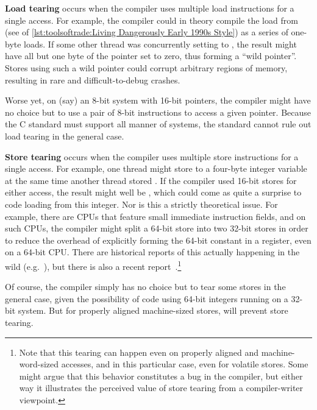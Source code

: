 {\bf Load tearing} occurs when the compiler uses multiple load
instructions for a single access.
For example, the compiler could in theory compile the load from
 (see
 of
\cref{lst:toolsoftrade:Living Dangerously Early 1990s Style})
as a series of one-byte loads.
If some other thread was concurrently setting  to
, the result might have all but one byte of the pointer
set to zero, thus forming a ``wild pointer''.
Stores using such a wild pointer could corrupt arbitrary
regions of memory, resulting in rare and difficult-to-debug crashes.

Worse yet, on (say) an 8-bit system with 16-bit pointers, the compiler
might have no choice but to use a pair of 8-bit instructions to access
a given pointer.
Because the C standard must support all manner of systems, the standard
cannot rule out load tearing in the general case.

{\bf Store tearing} occurs when the compiler uses multiple store
instructions for a single access.
For example, one thread might store  to a four-byte integer
variable at the same time another thread stored .
If the compiler used 16-bit stores for either access, the result
might well be , which could come as quite a surprise to
code loading from this integer.
Nor is this a strictly theoretical issue.
For example, there are CPUs that feature small immediate instruction
fields, and on such CPUs, the compiler might split a 64-bit store into
two 32-bit stores in order to reduce the overhead of explicitly forming
the 64-bit constant in a register, even on a 64-bit CPU\@.
There are historical reports of this actually happening in
the wild (e.g.~\cite{KonstantinKhlebnikov2013gccstoretearing}),
but there is also a recent
report~\cite{WillDeacon2019StoreTearingReport}.\footnote{
	Note that this tearing can happen even on properly aligned
	and machine-word-sized accesses, and in this particular case,
	even for volatile stores.
	Some might argue that this behavior constitutes a bug in the
	compiler, but either way it illustrates the perceived value of
	store tearing from a compiler-writer viewpoint.
}

Of course, the compiler simply has no choice but to tear some stores
in the general case, given
the possibility of code using 64-bit integers running on a 32-bit system.
But for properly aligned machine-sized stores,  will
prevent store tearing.

